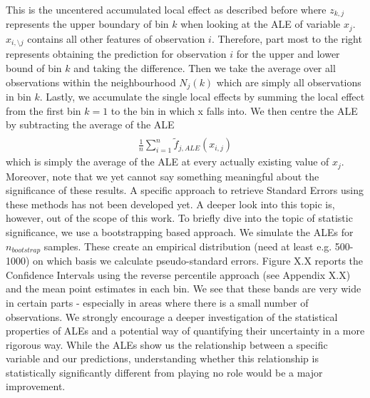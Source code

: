 This is the uncentered accumulated local effect as described before where $z_{k, j}$  represents the upper boundary of bin $k$ when looking at the ALE of variable $x_j$. $x_{i,\setminus j}$ contains all other features of observation $i$. Therefore, part most to the right represents obtaining the prediction for observation $i$ for the upper and lower bound of bin $k$ and taking the difference. Then we take the average over all observations within the neighbourhood $N_j(k)$ which are simply all observations in bin $k$. Lastly, we accumulate the single local effects by summing the local effect from the first bin $k=1$ to the bin in which x falls into. We then centre the ALE by subtracting the average of the ALE 
\begin{align*}
    \frac{1}{n}\sum_{i=1}^n\hat{\tilde{f}}_{j, ALE}(x_{i,j})
\end{align*}
which is simply the average of the ALE at every actually existing value of $x_j$.\\ 
Moreover, note that we yet cannot say something meaningful about the significance of these results. A specific approach to retrieve Standard Errors using these methods has not been developed yet. A deeper look into this topic is, however, out of the scope of this work. To briefly dive into the topic of statistic significance, we use a bootstrapping based approach. We simulate the ALEs for $n_{bootstrap}$ samples. These create an empirical distribution (need at least e.g. 500-1000) on which basis we calculate pseudo-standard errors. Figure X.X reports the Confidence Intervals using the reverse percentile approach (see Appendix X.X) and the mean point estimates in each bin. We see that these bands are very wide in certain parts - especially in areas where there is a small number of observations. We strongly encourage a deeper investigation of the statistical properties of ALEs and a potential way of quantifying their uncertainty in a more rigorous way. While the ALEs show us the relationship between a specific variable and our predictions, understanding whether this relationship is statistically significantly different from playing no role would be a major improvement. 